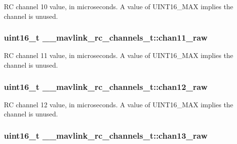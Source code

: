 R\+C channel 10 value, in microseconds. A value of U\+I\+N\+T16\+\_\+\+M\+A\+X implies the channel is unused. 

\hypertarget{struct____mavlink__rc__channels__t_aa472d84cf1f4a45ea456497919538910}{
\subsubsection[{chan11\+\_\+raw}]{\setlength{\rightskip}{0pt plus 5cm}uint16\+\_\+t \+\_\+\+\_\+mavlink\+\_\+rc\+\_\+channels\+\_\+t\+::chan11\+\_\+raw}}\label{struct____mavlink__rc__channels__t_aa472d84cf1f4a45ea456497919538910}


R\+C channel 11 value, in microseconds. A value of U\+I\+N\+T16\+\_\+\+M\+A\+X implies the channel is unused. 

\hypertarget{struct____mavlink__rc__channels__t_a9d738f5aba2e79ab747daf3bf937b2a2}{
\subsubsection[{chan12\+\_\+raw}]{\setlength{\rightskip}{0pt plus 5cm}uint16\+\_\+t \+\_\+\+\_\+mavlink\+\_\+rc\+\_\+channels\+\_\+t\+::chan12\+\_\+raw}}\label{struct____mavlink__rc__channels__t_a9d738f5aba2e79ab747daf3bf937b2a2}


R\+C channel 12 value, in microseconds. A value of U\+I\+N\+T16\+\_\+\+M\+A\+X implies the channel is unused. 

\hypertarget{struct____mavlink__rc__channels__t_a378625790bec2c632fa4d372ae25dd20}{
\subsubsection[{chan13\+\_\+raw}]{\setlength{\rightskip}{0pt plus 5cm}uint16\+\_\+t \+\_\+\+\_\+mavlink\+\_\+rc\+\_\+channels\+\_\+t\+::chan13\+\_\+raw}}\label{struct____mavlink__rc__channels__t_a378625790bec2c632fa4d372ae25dd20}


